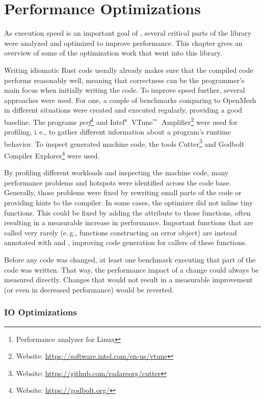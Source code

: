 \section{Performance Optimizations}

As execution speed is an important goal of , several critical parts of the library were analyzed and optimized to improve performance.
This chapter gives an overview of some of the optimization work that went into this library.

Writing idiomatic Rust code usually already makes sure that the compiled code performs reasonably well, meaning that correctness can be the programmer's main focus when initially writing the code.
To improve speed further, several approaches were used.
For one, a couple of benchmarks comparing  to OpenMesh in different situations were created and executed regularly, providing a good baseline.
The programs \emph{perf}\footnote{Performance analyzer for Linux} and Intel$^\text{\tiny ®}$~VTune$^\text{\tiny ™}$~Amplifier\footnote{Website: \url{https://software.intel.com/en-us/vtune}} were used for profiling, i.\,e., to gather different information about a program's runtime behavior.
To inspect generated machine code, the tools Cutter\footnote{Website: \url{https://github.com/radareorg/cutter}} and Godbolt Compiler Explorer\footnote{Website: \url{https://godbolt.org/}} were used.

By profiling different workloads and inspecting the machine code, many performance problems and hotspots were identified across the code base.
Generally, those problems were fixed by rewriting small parts of the code or providing hints to the compiler.
In some cases, the optimizer did not inline tiny functions.
This could be fixed by adding the  attribute to those functions, often resulting in a measurable increase in performance.
Important functions that are called very rarely (e.\,g., functions constructing an error object) are instead annotated with  and \code{#[cold]}, improving code generation for callers of these functions.

Before any code was changed, at least one benchmark executing that part of the code was written.
That way, the performance impact of a change could always be measured directly.
Changes that would not result in a measurable improvement (or even in decreased performance) would be reverted.

\vspace{-1mm}
\subsubsection*{IO Optimizations}

